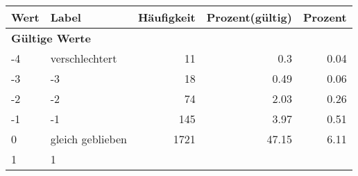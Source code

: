      \begin{longtable}{lXrrr}
     \toprule
     \textbf{Wert} & \textbf{Label} & \textbf{Häufigkeit} & \textbf{Prozent(gültig)} & \textbf{Prozent} \\
     \endhead
     \midrule
     \multicolumn{5}{l}{\textbf{Gültige Werte}}\\

     -4 &
     \multicolumn{1}{X}{ verschlechtert   } &


       \num{11} &
       \num[round-mode=places,round-precision=2]{0,3} &
         \num[round-mode=places,round-precision=2]{0,04} \\

     -3 &
     \multicolumn{1}{X}{ -3   } &


       \num{18} &
       \num[round-mode=places,round-precision=2]{0,49} &
         \num[round-mode=places,round-precision=2]{0,06} \\

     -2 &
     \multicolumn{1}{X}{ -2   } &


       \num{74} &
       \num[round-mode=places,round-precision=2]{2,03} &
         \num[round-mode=places,round-precision=2]{0,26} \\

     -1 &
     \multicolumn{1}{X}{ -1   } &


       \num{145} &
       \num[round-mode=places,round-precision=2]{3,97} &
         \num[round-mode=places,round-precision=2]{0,51} \\

     0 &
     \multicolumn{1}{X}{ gleich geblieben   } &


       \num{1721} &
       \num[round-mode=places,round-precision=2]{47,15} &
         \num[round-mode=places,round-precision=2]{6,11} \\

     1 &
     \multicolumn{1}{X}{ 1   } &



\end{longtable}

